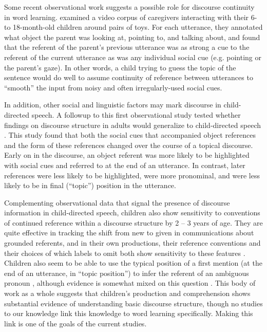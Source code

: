 \documentclass[man]{apa2}
\begin{document}
Some recent observational work suggests a possible role for discourse continuity in word learning.  examined a video corpus of caregivers interacting with their 6- to 18-month-old children around pairs of toys. For each utterance, they annotated what object the parent was looking at, pointing to, and talking about, and found that the referent of the parent's previous utterance was as strong a cue to the referent of the current utterance as was any individual social cue (e.g. pointing or the parent's gaze). In other words, a child trying to guess the topic of the sentence would do well to assume continuity of reference between utterances to ``smooth'' the input from noisy and often irregularly-used social cues.

In addition, other social and linguistic factors may mark discourse in child-directed speech. A followup to this first observational study tested whether findings on discourse structure in adults would generalize to child-directed speech \cite{rohde2014}. This study found that both the social cues that accompanied object references and the form of these references changed over the course of a topical discourse. Early on in the discourse, an object referent was more likely to be highlighted with social cues and referred to at the end of an utterance. In contrast, later references were less likely to be highlighted, were more pronominal, and were less likely to be in final (``topic'') position in the utterance. 

Complementing observational data that signal the presence of discourse information in child-directed speech, children also show sensitivity to conventions of continued reference within a discourse structure by 2 -- 3 years of age.  They are quite effective in tracking the shift from new to given in communications about grounded referents, and in their own productions, their reference conventions and their choices of which labels to omit both show sensitivity to these features \cite{allen2000, bates1976, greenfield1976, clancy2004, skarabela2007}.  Children also seem to be able to use the typical position of a first mention (at the end of an utterance, in ``topic position'') to infer the referent of an ambiguous pronoun \cite{song2005, song2007, pyykkonen2010, hartshorne2014}, although evidence is somewhat mixed on this question \cite{arnold2007}. This body of work as a whole suggests that children's production and comprehension shows substantial evidence of understanding basic discourse structure, though no studies to our knowledge link this knowledge to word learning specifically. Making this link is one of the goals of the current studies.
\end{document}
